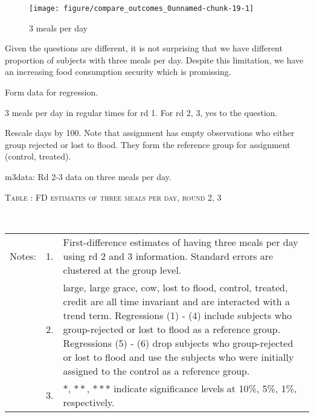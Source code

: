 \begin{Schunk}
\begin{figure}

{\centering \texttt{[image: figure/compare\_outcomes\_0unnamed-chunk-19-1]} 

}

\caption[3 meals per day]{3 meals per day}\label{Figureunnamed-chunk-19}
\end{figure}
\end{Schunk}
Given the questions are different, it is not surprising that we have different proportion of subjects with three meals per day. Despite this limitation, we have an increasing food consumption security which is promissing.

Form data for regression.

3 meals per day in regular times for rd 1. For rd 2, 3, yes to the question.

Rescale days by 100. Note that \textsf{assignment} has empty observations who either group rejected or lost to flood. They form the reference group for \textsf{assignment (control, treated)}. 

\textsf{m3data}: Rd 2-3 data on three meals per day. 


\begin{table}
\hfil\textsc{\footnotesize Table \thetable: FD estimates of three meals per day, round 2, 3\label{FD3meals}}\\
\setlength{\tabcolsep}{1pt}
\renewcommand{\arraystretch}{.6}
\hfil{}\\
\renewcommand{\arraystretch}{1}

\vspace{-4ex}
\hfil\begin{tabular}{>{\hfill\scriptsize}p{1cm}<{}>{\hfill\scriptsize}p{.25cm}<{}>{\scriptsize}p{11.5cm}<{\hfill}}
Notes:& 1. & First-difference estimates of having three meals per day using rd 2 and 3 information. Standard errors are clustered at the group level.\\[-1ex]
& 2. & \textsf{large, large grace, cow, lost to flood, control, treated, credit} are all time invariant and are interacted with a trend term. 
Regressions (1) - (4) include subjects who group-rejected or lost to flood as a reference group. Regressions (5) - (6) drop subjects who group-rejected or lost to flood and use the subjects who were initially assigned to the control as a reference group.\\
& 3. & $*$, $**$, $***$ indicate significance levels at 10\%, 5\%, 1\%, respectively.\\
\end{tabular}
\end{table}

